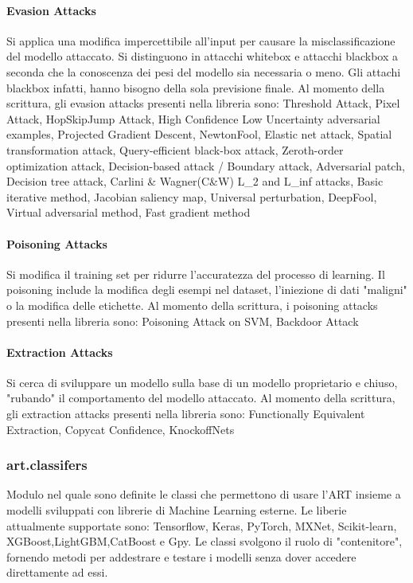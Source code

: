\paragraph{Evasion Attacks}
Si applica una modifica impercettibile all'input per causare la misclassificazione  del modello attaccato. Si distinguono in attacchi whitebox  e attacchi blackbox a seconda che la conoscenza dei pesi del modello
sia necessaria o meno. Gli attachi blackbox infatti, hanno bisogno della sola previsione finale. Al momento della scrittura, gli evasion attacks presenti nella libreria sono:
 Threshold Attack, Pixel Attack, HopSkipJump Attack, High Confidence Low Uncertainty adversarial examples, Projected Gradient Descent, NewtonFool, Elastic net attack,
Spatial transformation attack, Query-efficient black-box attack, Zeroth-order optimization attack, Decision-based attack / Boundary attack, Adversarial patch, Decision tree attack,
Carlini \& Wagner(C\&W) L\_2 and L\_inf attacks, Basic iterative method, Jacobian saliency map, Universal perturbation, DeepFool, Virtual adversarial method, Fast gradient method

\paragraph{Poisoning Attacks}
Si modifica il training set per ridurre l'accuratezza del processo di learning. Il poisoning include la modifica degli esempi nel dataset, l'iniezione di dati "maligni" o la modifica
delle etichette. Al momento della scrittura, i poisoning attacks presenti nella libreria sono: Poisoning Attack on SVM, Backdoor Attack

\paragraph{Extraction Attacks} Si cerca di sviluppare un modello sulla base di un modello proprietario e chiuso, "rubando" il comportamento del modello attaccato. Al momento della scrittura, gli extraction attacks presenti nella libreria sono: 
Functionally Equivalent Extraction, Copycat Confidence, KnockoffNets

\subsubsection{art.classifers}
Modulo nel quale sono definite le classi che permettono di usare l'ART insieme a modelli sviluppati con librerie di Machine Learning esterne.  Le liberie attualmente supportate sono: 
Tensorflow, Keras, PyTorch, MXNet, Scikit-learn, XGBoost,LightGBM,CatBoost e Gpy. Le classi svolgono il ruolo di "contenitore", fornendo metodi per addestrare e testare i modelli senza dover accedere direttamente
ad essi.
